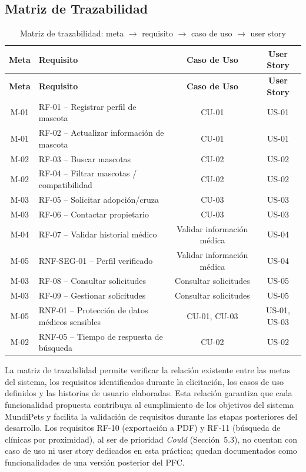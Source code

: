 \documentclass[journal,onecolumn]{IEEEtran}
\begin{document}
\subsection{Matriz de Trazabilidad}

\begin{longtable}{|c|p{7cm}|c|c|}
\caption{Matriz de trazabilidad: meta $\rightarrow$ requisito $\rightarrow$ caso de uso $\rightarrow$ user story}
\label{tab:trazabilidad}\\
\hline
\textbf{Meta} & \textbf{Requisito} & \textbf{Caso de Uso} & \textbf{User Story} \\
\hline
\endfirsthead
\hline
\textbf{Meta} & \textbf{Requisito} & \textbf{Caso de Uso} & \textbf{User Story} \\
\hline
\endhead
M-01 & RF-01 -- Registrar perfil de mascota & CU-01 & US-01 \\
\hline
M-01 & RF-02 -- Actualizar información de mascota & CU-01 & US-01 \\
\hline
M-02 & RF-03 -- Buscar mascotas & CU-02 & US-02 \\
\hline
M-02 & RF-04 -- Filtrar mascotas / compatibilidad & CU-02 & US-02 \\
\hline
M-03 & RF-05 -- Solicitar adopción/cruza & CU-03 & US-03 \\
\hline
M-03 & RF-06 -- Contactar propietario & CU-03 & US-03 \\
\hline
M-04 & RF-07 -- Validar historial médico & Validar información médica & US-04 \\
\hline
M-05 & RNF-SEG-01 -- Perfil verificado & Validar información médica & US-04 \\
\hline
M-03 & RF-08 -- Consultar solicitudes & Consultar solicitudes & US-05 \\
\hline
M-03 & RF-09 -- Gestionar solicitudes & Consultar solicitudes & US-05 \\
\hline
M-05 & RNF-01 -- Protección de datos médicos sensibles & CU-01, CU-03 & US-01, US-03 \\
\hline
M-02 & RNF-05 -- Tiempo de respuesta de búsqueda & CU-02 & US-02 \\
\hline
\end{longtable}

La matriz de trazabilidad permite verificar la relación existente entre las
metas del sistema, los requisitos identificados durante la elicitación, los
casos de uso definidos y las historias de usuario elaboradas. Esta relación
garantiza que cada funcionalidad propuesta contribuya al cumplimiento de
los objetivos del sistema MundiPets y facilita la validación de requisitos
durante las etapas posteriores del desarrollo. Los requisitos RF-10
(exportación a PDF) y RF-11 (búsqueda de clínicas por proximidad), al ser de
prioridad \textit{Could} (Sección~5.3), no cuentan con caso de uso ni user
story dedicados en esta práctica; quedan documentados como funcionalidades
de una versión posterior del PFC.
\end{document}

